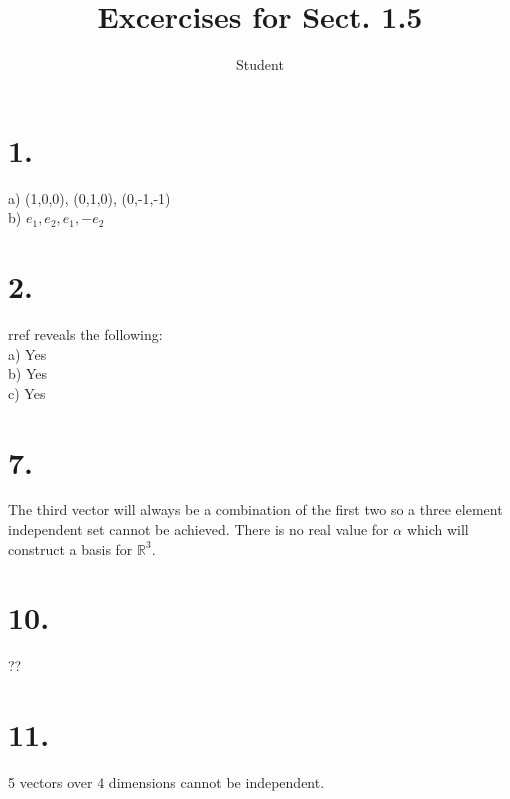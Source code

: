 \documentclass{article}
\title{Excercises for Sect. 1.5}
\author{Student}
\begin{document}
\maketitle
\section*{1.}
a) {(1,0,0), (0,1,0), (0,-1,-1)}\\
b) ${e_1, e_2, e_1, -e_2}$
\section*{2.}
rref reveals the following:\\
a) Yes\\
b) Yes\\
c) Yes\\
\section*{7.}
The third vector will always be a combination of the first two so a three element independent set cannot be achieved.
There is no real value for $\alpha$ which will construct a basis for $\mathbb{R}^3$.\\
\section*{10.}
??
\section*{11.}
5 vectors over 4 dimensions cannot be independent.
\end{document}

